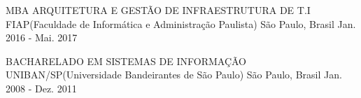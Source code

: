 

\begin{cventries}

  \cventry
    {MBA ARQUITETURA E GESTÃO DE INFRAESTRUTURA DE T.I} %
    {FIAP(Faculdade de Informática e Administração Paulista)} %
    {São Paulo, Brasil} %
    {Jan. 2016 - Mai. 2017} %
    {
      \begin{cvitems} %
      \end{cvitems}
    }
  
  \cventry
    {BACHARELADO EM SISTEMAS DE INFORMAÇÃO} %
    {UNIBAN/SP(Universidade Bandeirantes de São Paulo)} %
    {São Paulo, Brasil} %
    {Jan. 2008 - Dez. 2011} %
    {
      \begin{cvitems} %
      \end{cvitems}
    }

\end{cventries}
